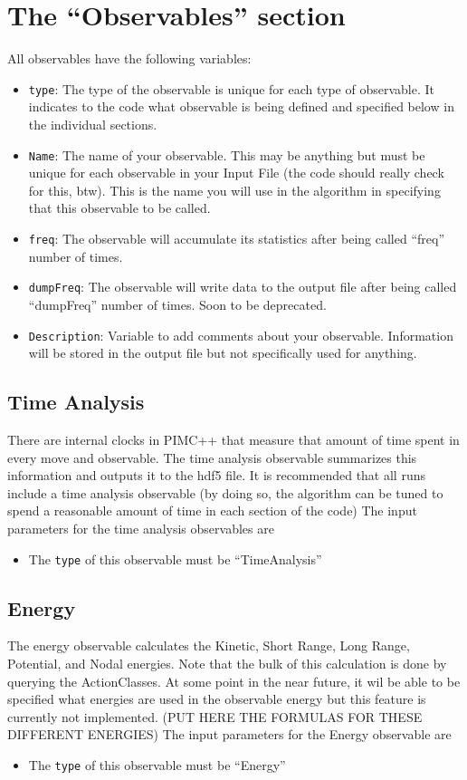 \documentclass{book}
\begin{document}
\section{The ``Observables'' section}
All observables have the following variables:
\begin{itemize}
\item \texttt{type}: The type of the observable is unique for each
  type of observable.  It indicates to the code what observable is being
  defined and specified below in the individual sections.

\item \texttt{Name}: The name of your observable. This may be anything
   but must be unique for each observable in your Input File (the code should
   really check for this, btw).  This is the name you will use in the
   algorithm in specifying that this observable to be called.

\item \texttt{freq}:  The observable will accumulate its statistics
  after being called ``freq'' number of times.  
\item \texttt{dumpFreq}: The observable will write data to the output
  file after being called ``dumpFreq'' number of times. Soon to be
  deprecated.
\item \texttt {Description}: Variable to add comments about your
  observable. Information will be stored in the output file but not
  specifically used for anything.

\end{itemize}
\subsection{Time Analysis}
There are internal clocks in PIMC++ that measure that amount of time
spent in every move and observable.  The time analysis observable
summarizes this information and outputs it to the hdf5 file. It is
recommended that all runs include a time analysis observable (by doing
so, the algorithm can be tuned to spend a reasonable amount of time in
each section of the code) 
The input parameters for the time analysis observables are 
\begin{itemize}
\item The \texttt{type} of this observable must be ``TimeAnalysis''
\end{itemize}
\subsection{Energy}
The energy observable calculates the Kinetic, Short Range, Long Range,
Potential, and Nodal energies. Note that the bulk of this calculation
is done by querying the ActionClasses. At some point in the near
future, it wil be able to be specified what energies are used in the
observable energy but this feature is currently not implemented.  (PUT
HERE THE FORMULAS FOR THESE DIFFERENT ENERGIES) 
The input parameters for the Energy observable are 
\begin{itemize}
\item The \texttt{type} of this observable must be ``Energy''
\end{itemize}
\end{document}
